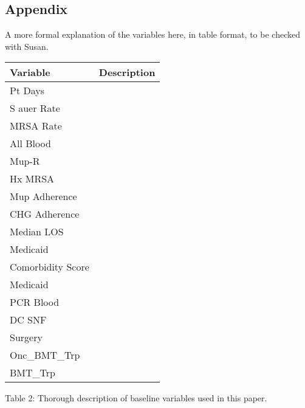 \documentclass[]{sagej}
\begin{document}
\subsection{Appendix}\label{appendix}

A more formal explanation of the variables here, in table format, to be
checked with Susan.

\begin{longtable}[]{@{}ll@{}}
\toprule
Variable & Description\tabularnewline
\midrule
\endhead
Pt Days &\tabularnewline
S auer Rate &\tabularnewline
MRSA Rate &\tabularnewline
All Blood &\tabularnewline
Mup-R &\tabularnewline
Hx MRSA &\tabularnewline
Mup Adherence &\tabularnewline
CHG Adherence &\tabularnewline
Median LOS &\tabularnewline
Medicaid &\tabularnewline
Comorbidity Score &\tabularnewline
Medicaid &\tabularnewline
PCR Blood &\tabularnewline
DC SNF &\tabularnewline
Surgery &\tabularnewline
Onc\_BMT\_Trp &\tabularnewline
BMT\_Trp &\tabularnewline
\bottomrule
\end{longtable}

Table 2: Thorough description of baseline variables used in this paper.


\end{document}
